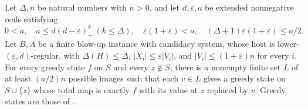 \begin{lemma}
Let $\Delta,n$ be natural numbers with $n>0$, and let $d,\varepsilon,a$
be extended nonnegative reals satisfying
\[
 0<a,\quad a\leq d(d-\varepsilon)_+^k\ (k\leq\Delta),\quad
 \varepsilon(1+\varepsilon)<a,\quad
 (\Delta+1)\varepsilon(1+\varepsilon)\leq a/2.
\]
Let $B,A$ be a finite blow-up instance with candidacy system, whose
host is lower-$(\varepsilon,d)$-regular, with
$\Delta(H)\leq\Delta$, $|X_i|\leq\varepsilon|V_i|$, and
$|V_i|\leq(1+\varepsilon)n$ for every $i$. For every greedy state
$f$ on $S$ and every $z\notin S$, there is a nonempty finite set $L$
of at least $(a/2)n$ possible images such that each $v\in L$ gives a
greedy state on $S\cup\{z\}$ whose total map is exactly $f$ with its
value at $z$ replaced by $v$. Greedy states are those of
.
\end{lemma}

